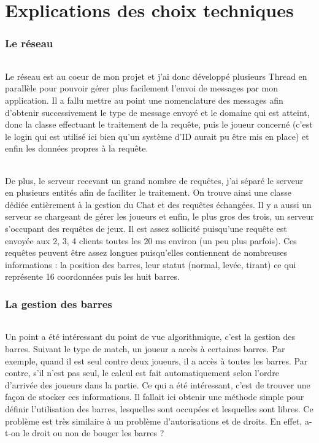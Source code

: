 \documentclass[a4paper,12pt]{report}
\begin{document}
\part{Explications des choix techniques}
\section{Le réseau}
\paragraph{}
Le réseau est au coeur de mon projet et j'ai donc développé plusieurs Thread en parallèle pour pouvoir gérer plus facilement l'envoi de messages par mon application.
Il a fallu mettre au point une nomenclature des messages afin d'obtenir successivement le type de message envoyé et le domaine qui est atteint, donc la classe effectuant le traitement de la requête, puis le joueur concerné (c'est le login qui est utilisé ici bien qu'un système d'ID aurait pu être mis en place) et enfin les données propres à la requête.
\paragraph{}
De plus, le serveur recevant un grand nombre de requêtes, j'ai séparé le serveur en plusieurs entités afin de faciliter le traitement. On trouve ainsi une classe dédiée entièrement à la gestion du Chat et des requêtes échangées. Il y a aussi un serveur se chargeant de gérer les joueurs et enfin, le plus gros des trois, un serveur s'occupant des requêtes de jeux. Il est assez sollicité puisqu'une requête est envoyée aux 2, 3, 4 clients toutes les 20 ms environ (un peu plus parfois). Ces requêtes peuvent être assez longues puisqu'elles contiennent de nombreuses informations : la position des barres, leur statut (normal, levée, tirant) ce qui représente 16 coordonnées puis les huit barres.
\section{La gestion des barres}
\paragraph{}
Un point a été intéressant du point de vue algorithmique, c'est la gestion des barres. Suivant le type de match, un joueur a accès à certaines barres. Par exemple, quand il est seul contre deux joueurs, il a accès à toutes les barres. Par contre, s'il n'est pas seul, le calcul est fait automatiquement selon l'ordre d'arrivée des joueurs dans la partie. Ce qui a été intéressant, c'est de trouver une façon de stocker ces informations. Il fallait ici obtenir une méthode simple pour définir \og l'utilisation \fg des barres, lesquelles sont occupées et lesquelles sont libres. Ce problème est très similaire à un problème d'autorisations et de droits. En effet, a-t-on le droit ou non de bouger les barres ?
\end{document}
